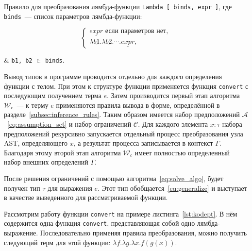 Правило для преобразования лямбда-функции \lstinline{Lambda [ binds, expr ]}, где \lstinline{binds}~--- список параметров лямбда-функции:

\begin{equation*}
    \begin{cases}
        \underline{expr} \text{ если параметров нет}, \\
        \lambda \underline{b1}. \lambda \underline{b2}. \cdots. \underline{expr},
    \end{cases}
\end{equation*}
\begin{eqrem}
    & \texttt{b1, b2} $\in$ \texttt{binds}.
\end{eqrem}

Вывод типов в программе проводится отдельно для каждого определения функции с телом.
При этом к структуре функции применяется функция \lstinline{convert} с последующим получением терма $e$.
Затем производится первый этап алгоритма $\mathcal{W}_c$~--- к терму $e$ применяются правила вывода в форме, определённой в разделе~\ref{subsec:inference_rules}.
Таким образом имеется набор предположений $\mathcal{A}$~\eqref{eq:assumption_set} и набор ограничений $\mathcal{C}$.
Для каждого элемента $x: \tau$ набора предположений рекурсивно запускается отдельный процесс преобразования узла AST, определяющего $x$, а результат процесса записывается в контекст $\Gamma$.
Благодаря этому второй этап алгоритма $\mathcal{W}_c$ имеет полностью определенный набор внешних определений $\Gamma$.

После решения ограничений с помощью алгоритма~\ref{eq:solve_algo}, будет получен тип $\tau$ для выражения $e$.
Этот тип обобщается~\eqref{eq:generalize} и выступает в качестве выведенного для рассматриваемой функции.

Рассмотрим работу функции \lstinline{convert} на примере листинга~\ref{lst:kodept}.
В нём содержится одна функция \lstinline{convert}, представляющая собой одно лямбда-выражение.
Последовательно применяя правила преобразования, можно получить следующий терм для этой функции: $\lambda f. \lambda g. \lambda x. f(g(x))$.

